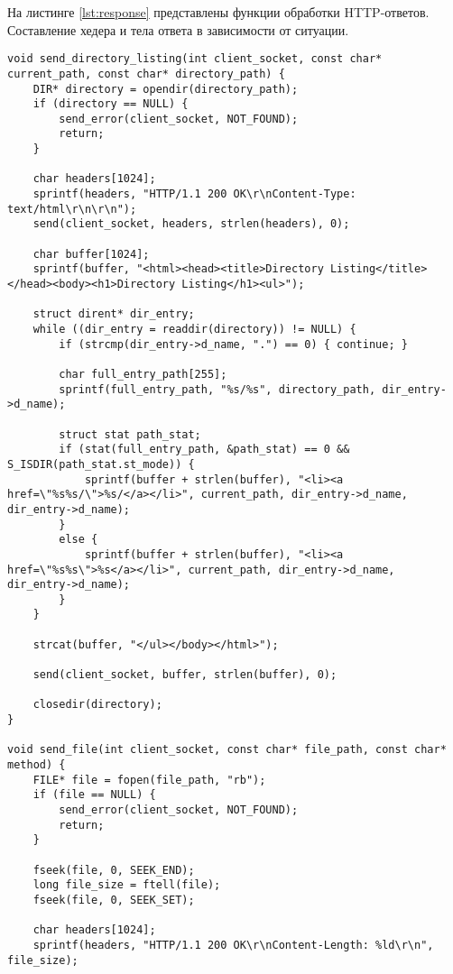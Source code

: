 \documentclass{bmstu}
\begin{document}
На листинге \ref{lst:response} представлены функции обработки HTTP-ответов. Составление хедера и тела ответа в зависимости от ситуации.

\begin{lstlisting}[caption={Обработка HTTP-ответов}, label=lst:response]
void send_directory_listing(int client_socket, const char* current_path, const char* directory_path) {
    DIR* directory = opendir(directory_path);
    if (directory == NULL) {
        send_error(client_socket, NOT_FOUND);
        return;
    }

    char headers[1024];
    sprintf(headers, "HTTP/1.1 200 OK\r\nContent-Type: text/html\r\n\r\n");
    send(client_socket, headers, strlen(headers), 0);

    char buffer[1024];
    sprintf(buffer, "<html><head><title>Directory Listing</title></head><body><h1>Directory Listing</h1><ul>");

    struct dirent* dir_entry;
    while ((dir_entry = readdir(directory)) != NULL) {
        if (strcmp(dir_entry->d_name, ".") == 0) { continue; }

        char full_entry_path[255];
        sprintf(full_entry_path, "%s/%s", directory_path, dir_entry->d_name);

        struct stat path_stat;
        if (stat(full_entry_path, &path_stat) == 0 && S_ISDIR(path_stat.st_mode)) {
            sprintf(buffer + strlen(buffer), "<li><a href=\"%s%s/\">%s/</a></li>", current_path, dir_entry->d_name, dir_entry->d_name);
        }
        else {
            sprintf(buffer + strlen(buffer), "<li><a href=\"%s%s\">%s</a></li>", current_path, dir_entry->d_name, dir_entry->d_name);
        }
    }

    strcat(buffer, "</ul></body></html>");

    send(client_socket, buffer, strlen(buffer), 0);

    closedir(directory);
}

void send_file(int client_socket, const char* file_path, const char* method) {
    FILE* file = fopen(file_path, "rb");
    if (file == NULL) {
        send_error(client_socket, NOT_FOUND);
        return;
    }

    fseek(file, 0, SEEK_END);
    long file_size = ftell(file);
    fseek(file, 0, SEEK_SET);

    char headers[1024];
    sprintf(headers, "HTTP/1.1 200 OK\r\nContent-Length: %ld\r\n", file_size);


\end{lstlisting}
\end{document}
